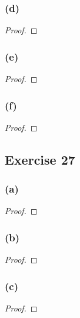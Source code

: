 \documentclass[14pt]{extarticle}
\begin{document}
\subsubsection{(d)}

\begin{proof}

\end{proof}

\subsubsection{(e)}

\begin{proof}

\end{proof}

\subsubsection{(f)}

\begin{proof}

\end{proof}

\subsection{Exercise 27}

\subsubsection{(a)}

\begin{proof}

\end{proof}

\subsubsection{(b)}

\begin{proof}

\end{proof}

\subsubsection{(c)}

\begin{proof}

\end{proof}
\end{document}
